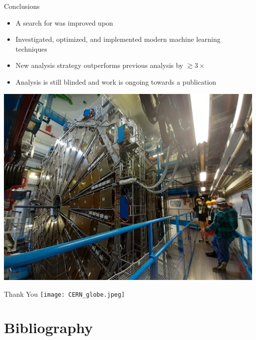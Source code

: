 \documentclass[aspectratio=169,xcolor=table]{beamer}
\begin{document}
  \begin{frame}[t]{Conclusions}
    \begin{itemize}
      \item A search for \HpmLong was improved upon
      \item Investigated, optimized, and implemented modern machine learning techniques 
      \item New analysis strategy outperforms previous analysis by $\gtrsim 3\times$
      \item Analysis is still blinded and work is ongoing towards a publication
    \end{itemize}
    \centering
    \includegraphics[height=.5\textheight,keepaspectratio=true]{ATLAS_Tour.jpg}
  \end{frame}

  \begin{frame}{Thank You}
    \centering
    \texttt{[image: CERN\_globe.jpeg]}
  \end{frame}

  \subsection { }

\appendix
\section{Bibliography }
\end{document}

